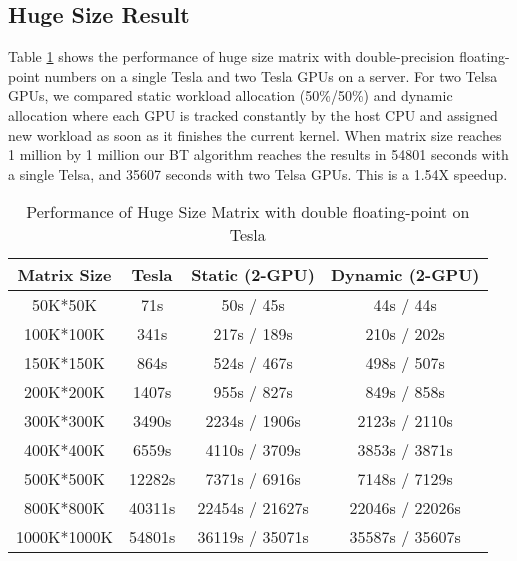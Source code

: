 \subsection{Huge Size Result}
Table \ref{tab:hugeResultTesla} shows the performance of huge size matrix with double-precision floating-point numbers on a single Tesla and two Tesla GPUs on a server. For two Telsa GPUs, we compared static workload allocation (50\%/50\%) and dynamic allocation where each GPU is tracked constantly by the host CPU and assigned new workload as soon as it finishes the current kernel. 
When matrix size reaches 1 million by 1 million our BT algorithm reaches the results in 54801 seconds with a single Telsa, and 35607 seconds with two Telsa GPUs. This is a 1.54X speedup.
\begin{table}[h]
\vspace{-0.3in}
\caption{Performance of Huge Size Matrix with double floating-point on Tesla}
\vspace{-0.1in}
\centering
\begin{tabular}{|c|c|c|c|}
\hline
Matrix Size &  Tesla  & Static (2-GPU) & Dynamic (2-GPU) \\ \hline
 50K*50K    &    71s  &   50s /  45s &  44s / 44s \\ \hline
 100K*100K  &   341s  &  217s / 189s &  210s / 202s \\ \hline
 150K*150K  &   864s  &  524s / 467s &  498s / 507s \\ \hline
 200K*200K  &  1407s  &  955s / 827s &  849s / 858s \\ \hline
 300K*300K  &  3490s  & 2234s / 1906s & 2123s / 2110s\\ \hline
 400K*400K  &  6559s  & 4110s / 3709s & 3853s / 3871s\\ \hline
 500K*500K  & 12282s  & 7371s / 6916s  & 7148s / 7129s\\ \hline
 800K*800K  & 40311s  & 22454s / 21627s &  22046s / 22026s   \\ \hline
 1000K*1000K & 54801s  & 36119s / 35071s   &  35587s / 35607s \\ \hline
\end{tabular}
\label{tab:hugeResultTesla}
\vspace{-0.3in}
\end{table}

